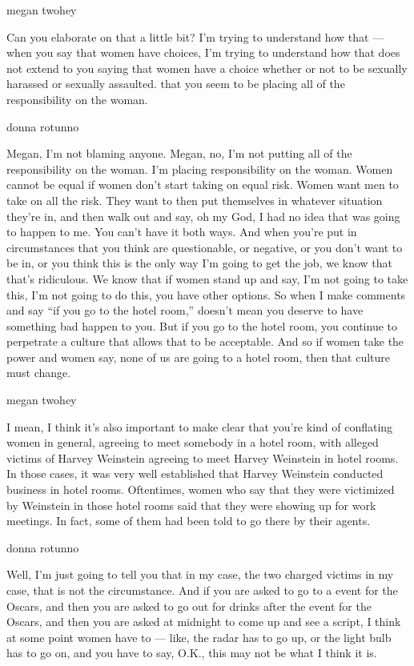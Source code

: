 megan twohey

Can you elaborate on that a little bit? I'm trying to understand how
that --- when you say that women have choices, I'm trying to understand
how that does not extend to you saying that women have a choice whether
or not to be sexually harassed or sexually assaulted. that you seem to
be placing all of the responsibility on the woman.

donna rotunno

Megan, I'm not blaming anyone. Megan, no, I'm not putting all of the
responsibility on the woman. I'm placing responsibility on the woman.
Women cannot be equal if women don't start taking on equal risk. Women
want men to take on all the risk. They want to then put themselves in
whatever situation they're in, and then walk out and say, oh my God, I
had no idea that was going to happen to me. You can't have it both ways.
And when you're put in circumstances that you think are questionable, or
negative, or you don't want to be in, or you think this is the only way
I'm going to get the job, we know that that's ridiculous. We know that
if women stand up and say, I'm not going to take this, I'm not going to
do this, you have other options. So when I make comments and say ``if
you go to the hotel room,'' doesn't mean you deserve to have something
bad happen to you. But if you go to the hotel room, you continue to
perpetrate a culture that allows that to be acceptable. And so if women
take the power and women say, none of us are going to a hotel room, then
that culture must change.

megan twohey

I mean, I think it's also important to make clear that you're kind of
conflating women in general, agreeing to meet somebody in a hotel room,
with alleged victims of Harvey Weinstein agreeing to meet Harvey
Weinstein in hotel rooms. In those cases, it was very well established
that Harvey Weinstein conducted business in hotel rooms. Oftentimes,
women who say that they were victimized by Weinstein in those hotel
rooms said that they were showing up for work meetings. In fact, some of
them had been told to go there by their agents.

donna rotunno

Well, I'm just going to tell you that in my case, the two charged
victims in my case, that is not the circumstance. And if you are asked
to go to a event for the Oscars, and then you are asked to go out for
drinks after the event for the Oscars, and then you are asked at
midnight to come up and see a script, I think at some point women have
to --- like, the radar has to go up, or the light bulb has to go on, and
you have to say, O.K., this may not be what I think it is.

